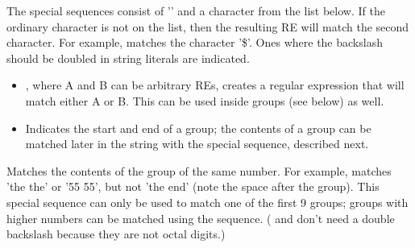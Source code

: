 The special sequences consist of '\code{\e}' and a character
from the list below.  If the ordinary character is not on the list,
then the resulting RE will match the second character.  For example,
\code{\e\$} matches the character '\$'.  Ones where the backslash
should be doubled in string literals are indicated.

\begin{itemize}
\item[\code{\e|}], where A and B can be arbitrary REs,
creates a regular expression that will match either A or B.  This can
be used inside groups (see below) as well.
%
\item[\code{\e( \e)}] Indicates the start and end of a group; the
contents of a group can be matched later in the string with the
\code{\e [1-9]} special sequence, described next.
\end{itemize}

\begin{fulllineitems}
\item[\code{\e \e 1, ... \e \e 7, \e 8, \e 9}]
Matches the contents of the group of the same
number.  For example,  matches 'the the' or
'55 55', but not 'the end' (note the space after the group).  This
special sequence can only be used to match one of the first 9 groups;
groups with higher numbers can be matched using the 
sequence.  ( and  don't need a double backslash
because they are not octal digits.)
\end{fulllineitems}


